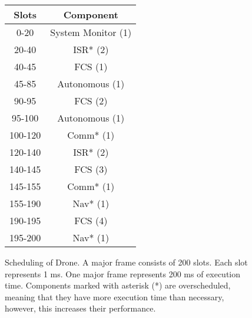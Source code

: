 \begin{figure}
	\centering
	\begin{tabular}{c | c }
		Slots & Component \\\hline
		0-20 & System Monitor (1) \\
		20-40 & ISR* (2) \\
		40-45 & FCS (1) \\
		45-85 & Autonomous (1) \\
		90-95 & FCS (2) \\
		95-100 & Autonomous (1) \\
		100-120 & Comm* (1) \\
		120-140 & ISR* (2) \\
		140-145 & FCS (3) \\
		145-155 & Comm* (1) \\
		155-190 & Nav* (1) \\
		190-195 & FCS (4) \\
		195-200 & Nav* (1) \\
	\end{tabular}
	\caption{Scheduling of Drone. 
	A major frame consists of 200 slots. 
	Each slot represents 1 ms. 
	One major frame represents 200 ms of execution time. 
	Components marked with asterisk (*) are overscheduled, meaning that they have more execution time than necessary, however, this increases their performance.}
	\label{tbl:drone:sched}
\end{figure}

